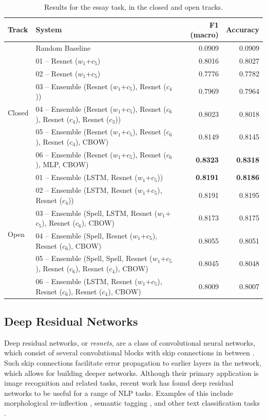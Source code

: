 \documentclass[11pt,letterpaper]{article}
\begin{document}
\begin{table}[htbp]
    \small
\center
\caption{Results for the essay task, in the closed and open tracks.}
\label{tab:results}
\begin{tabular}{llrr}
\toprule
\bf Track & \bf System & \bf F1 (macro) & \bf Accuracy \\
\midrule
& Random Baseline & 0.0909 & 0.0909 \\
\midrule
\multirow{6}{*}{Closed} & 01 -- Resnet ($w_1$+$c_5$) & 0.8016 & 0.8027 \\
& 02 -- Resnet ($w_1$+$c_5$) & 0.7776 & 0.7782 \\
& 03 -- Ensemble (Resnet ($w_1$+$c_5$), Resnet ($c_4$)) & 0.7969 & 0.7964 \\
& 04 -- Ensemble (Resnet ($w_1$+$c_5$), Resnet ($c_6$), Resnet ($c_4$), Resnet ($c_3$)) & 0.8023 & 0.8018 \\
& 05 -- Ensemble (Resnet ($w_1$+$c_5$), Resnet ($c_6$), Resnet ($c_4$), CBOW) & 0.8149 & 0.8145 \\
& 06 -- Ensemble (Resnet ($w_1$+$c_5$), Resnet ($c_6$), MLP, CBOW) & \bf 0.8323 & \bf 0.8318 \\
\midrule
\multirow{6}{*}{Open} & 01 -- Ensemble (LSTM, Resnet ($w_1$+$c_5$)) & \bf 0.8191 & \bf 0.8186 \\
& 02 -- Ensemble (LSTM, Resnet ($w_1$+$c_5$), Resnet ($c_4$)) & 0.8191   &  0.8195 \\
& 03 -- Ensemble (Spell, LSTM, Resnet ($w_1$+$c_5$), Resnet ($c_6$), CBOW) & 0.8173   &  0.8175 \\
& 04 -- Ensemble (Spell, Resnet ($w_1$+$c_5$), Resnet ($c_6$), CBOW) & 0.8055   &  0.8051 \\
& 05 -- Ensemble (Spell, Spell, Resnet ($w_1$+$c_5$), Resnet ($c_6$), Resnet ($c_4$), CBOW) & 0.8045   &  0.8048 \\
& 06 -- Ensemble (LSTM, Resnet ($w_1$+$c_5$), Resnet ($c_6$), Resnet ($c_4$), CBOW)& 0.8009   &  0.8007 \\
\bottomrule
\end{tabular}
\end{table}
\subsection{Deep Residual Networks}
Deep residual networks, or \textit{resnets}, are a class of convolutional neural networks, which consist of several convolutional blocks with skip connections in between \citep{resnets:2015,He2016identity}.
Such skip connections facilitate error propagation to earlier layers in the network, which allows for building deeper networks.
Although their primary application is image recognition and related tasks, recent work has found deep residual networks to be useful for a range of NLP tasks.
Examples of this include morphological re-inflection \citep{robert:sigmorphon:2016},
semantic tagging \citep{bjerva:2016:semantic}, and other text classification tasks \citep{conneau:2016}.
\end{document}
